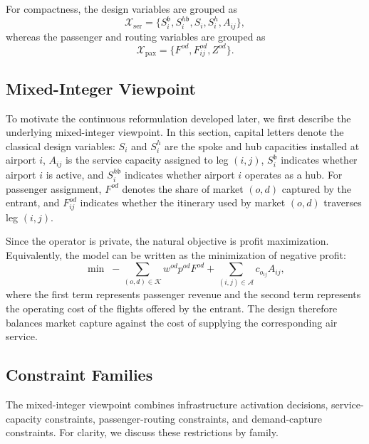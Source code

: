 For compactness, the design variables are grouped as
\begin{equation}
\mathcal{X}_{\mathrm{ser}}
=
\bigl\{S_i^{\mathfrak b},S_i^{h\mathfrak b},S_i,S_i^h,A_{ij}\bigr\},
\end{equation}
whereas the passenger and routing variables are grouped as
\begin{equation}
\mathcal{X}_{\mathrm{pax}}
=
\bigl\{F^{od},F_{ij}^{od},Z^{od}\bigr\}.
\end{equation}

\subsection{Mixed-Integer Viewpoint}
To motivate the continuous reformulation developed later, we first describe the underlying mixed-integer viewpoint. In this section, capital letters denote the classical design variables: $S_i$ and $S_i^h$ are the spoke and hub capacities installed at airport $i$, $A_{ij}$ is the service capacity assigned to leg $(i,j)$, $S_i^{\mathfrak b}$ indicates whether airport $i$ is active, and $S_i^{h\mathfrak b}$ indicates whether airport $i$ operates as a hub. For passenger assignment, $F^{od}$ denotes the share of market $(o,d)$ captured by the entrant, and $F_{ij}^{od}$ indicates whether the itinerary used by market $(o,d)$ traverses leg $(i,j)$.

Since the operator is private, the natural objective is profit maximization. Equivalently, the model can be written as the minimization of negative profit:
\begin{equation}
\min \; -\sum_{(o,d)\in\mathcal{K}} w^{od}p^{od}F^{od}
+\sum_{(i,j)\in\mathcal{A}} c_{o_{ij}}A_{ij},
\label{eq:profit_mip_view}
\end{equation}
where the first term represents passenger revenue and the second term represents the operating cost of the flights offered by the entrant. The design therefore balances market capture against the cost of supplying the corresponding air service.

\subsection{Constraint Families}
The mixed-integer viewpoint combines infrastructure activation decisions, service-capacity constraints, passenger-routing constraints, and demand-capture constraints. For clarity, we discuss these restrictions by family.

